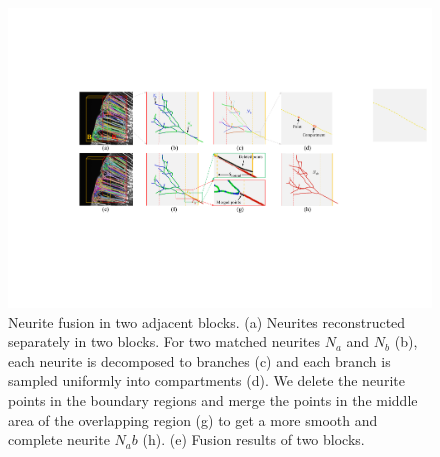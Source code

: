  
 \begin{figure}[t]
 	\centering
 	\includegraphics[width=1\columnwidth]{./Illustrations/fusion_algorithm.pdf}
 	\caption{Neurite fusion in two adjacent blocks. (a) Neurites reconstructed separately in two blocks. For two matched neurites $N_a$ and $N_b$ (b), each neurite is decomposed to branches (c) and each branch is sampled uniformly into compartments (d). We delete the neurite points in the boundary regions and merge the points in the middle area of the overlapping region (g) to get a more smooth and complete neurite $N_ab$ (h). (e) Fusion results of two blocks. }
 	\label{fig:fusion_algorithm}
 \end{figure}
 
 


